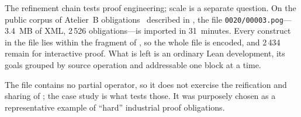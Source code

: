 \begingroup
{}
The refinement chain tests proof engineering; scale is a separate question.
On the public corpus of Atelier~B obligations~\cite{deharbe2022pog} described in
, the file \texttt{0020/00003.pog}---3.4~MB of XML,
2\,526 obligations---is imported in 31~minutes.
Every construct in the file lies within the fragment of , so
the whole file is encoded, and 2\,434 remain for interactive proof.
What is left is an ordinary Lean development, its goals grouped by source operation and
addressable one  block at a time.
\par
\endgroup

The file contains no partial operator, so it does not exercise the reification and sharing of
; the case study is what tests those. It was purposely chosen as a representative example of ``hard'' industrial proof obligations.
